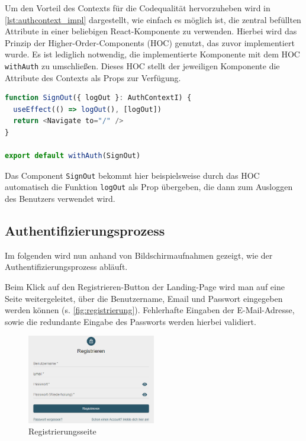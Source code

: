 Um den Vorteil des Contexts für die Codequalität hervorzuheben wird in \autoref{lst:authcontext_impl} dargestellt, wie einfach es möglich ist, die zentral befüllten Attribute in einer beliebigen React-Komponente zu verwenden.
Hierbei wird das Prinzip der Higher-Order-Components (HOC) genutzt, das zuvor implementiert wurde. Es ist lediglich notwendig, die implementierte Komponente mit dem HOC \texttt{withAuth} zu umschließen. Dieses HOC stellt der jeweiligen Komponente die Attribute des Contexts als Props zur Verfügung.

\begin{lstlisting}[language=JavaScript, caption=Verwendung des Authentifizierungscontext-HOCs, label={lst:authcontext_impl}]
function SignOut({ logOut }: AuthContextI) {
  useEffect(() => logOut(), [logOut])
  return <Navigate to="/" />
}

export default withAuth(SignOut)  
\end{lstlisting}

Das Component \texttt{SignOut} bekommt hier beispielsweise durch das HOC automatisch die Funktion \texttt{logOut} als Prop übergeben, die dann zum Ausloggen des Benutzers verwendet wird.

\subsection{Authentifizierungsprozess}
\label{sec:authentifizierungsprozess}

Im folgenden wird nun anhand von Bildschirmaufnahmen gezeigt, wie der Authentifizierungsprozess abläuft.

Beim Klick auf den Registrieren-Button der Landing-Page wird man auf eine Seite weitergeleitet, über die Benutzername, Email und Passwort eingegeben werden können (s. \autoref{fig:registrierung}). Fehlerhafte Eingaben der E-Mail-Adresse, sowie die redundante Eingabe des Passworts werden hierbei validiert.

\begin{figure}[!htb]
  \centering
  \includegraphics[width=0.5\textwidth]{figures/boas/21_registrieren.png}
  \caption[]{Registrierungsseite}
  \label{fig:registrierung}
\end{figure}

